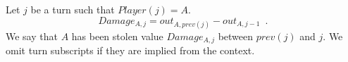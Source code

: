 {}
\begin{definition}[Damage]
  Let $j$ be a turn such that $Player\left(j\right) = A$.
  \begin{equation}
    Damage_{A, j} = out_{A, prev\left(j\right)} - out_{A, j-1} \enspace.
  \end{equation}
  We say that $A$ has been stolen value $Damage_{A, j}$ between $prev\left(j\right)$ and $j$. We omit turn subscripts
  if they are implied from the context.
\end{definition}
